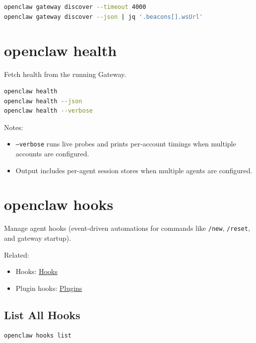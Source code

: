 \begin{lstlisting}[language=bash]
openclaw gateway discover --timeout 4000
openclaw gateway discover --json | jq '.beacons[].wsUrl'
\end{lstlisting}



\clearpage

\section{openclaw health}


Fetch health from the running Gateway.

\begin{lstlisting}[language=bash]
openclaw health
openclaw health --json
openclaw health --verbose
\end{lstlisting}


Notes:

\begin{itemize}
  \item \texttt{--verbose} runs live probes and prints per-account timings when multiple accounts are configured.
  \item Output includes per-agent session stores when multiple agents are configured.
\end{itemize}



\clearpage

\section{openclaw hooks}


Manage agent hooks (event-driven automations for commands like \texttt{/new}, \texttt{/reset}, and gateway startup).

Related:

\begin{itemize}
  \item Hooks: \href{/automation/hooks}{Hooks}
  \item Plugin hooks: \href{/tools/plugin\#plugin-hooks}{Plugins}
\end{itemize}


\subsection{List All Hooks}


\begin{lstlisting}[language=bash]
openclaw hooks list
\end{lstlisting}


